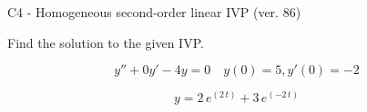 \begin{exercise}
  \begin{exerciseTitle}C4 - Homogeneous second-order linear IVP (ver. 86)\end{exerciseTitle}
  \begin{exerciseStatement}
    
Find the solution to the given IVP.

    
\[y''+0y'-4y = 0 \hspace{1em} y(0) = 5 , y'(0) = -2\]

  \end{exerciseStatement}
  \begin{exerciseAnswer}
    
\[y= 2 \, e^{\left(2 \, t\right)} + 3 \, e^{\left(-2 \, t\right)}\]

  \end{exerciseAnswer}
\end{exercise}